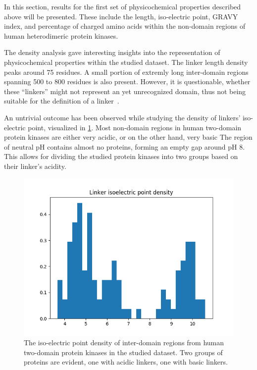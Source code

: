 \label{res}

\label{res:first}

	In this section, results for the first set of physicochemical properties described
	above will be presented.
	These include the length, iso-electric point, GRAVY index, and percentage of charged
	amino acids within the non-domain regions of human heterodimeric protein kinases.

	\label{res:first:dens}

		The density analysis gave interesting insights into the representation of
		physicochemical properties within the studied dataset.
		The linker length density peaks around 75 residues.
		A small portion of extremly long inter-domain regions spanning 500 to 800 residues is
		also present.
		However, it is questionable, whether these ``linkers'' might not represent an yet
		unrecognized domain, thus not being suitable for the definition of a
		linker~\cite{milano2016structural}.

		An untrivial outcome has been observed while studying the density of linkers'
		iso-electric point, visualized in \cref{fig:iso-dens}.
		Most non-domain regions in human two-domain protein kinases are either very acidic, or
		on the other hand, very basic
		The region of neutral pH contains almost no proteins, forming an empty gap around pH
		8.
		This allows for dividing the studied protein kinases into two groups based on their
		linker's acidity.

		\begin{figure}
			\centering
			\includegraphics[width=.7\linewidth]{img/iso_density.png}
			\caption{The iso-electric point density of inter-domain regions from human
			two-domain protein kinases in the studied dataset. Two groups of proteins are
			evident, one with acidic linkers, one with basic linkers.}
			\label{fig:iso-dens}
		\end{figure}


